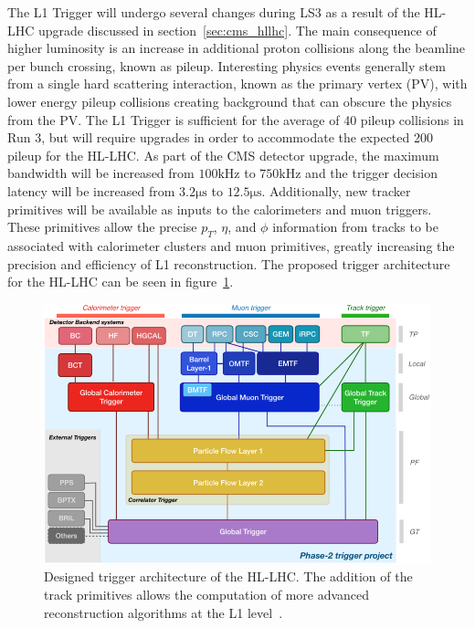 The L1 Trigger will undergo several changes during LS3 as a result of the HL-LHC upgrade discussed in section~\ref{sec:cms_hllhc}. The main consequence of higher luminosity is an increase in additional proton collisions along the beamline per bunch crossing, known as pileup. Interesting physics events generally stem from a single hard scattering interaction, known as the primary vertex (PV), with lower energy pileup collisions creating background that can obscure the physics from the PV. The L1 Trigger is sufficient for the average of 40 pileup collisions in Run 3, but will require upgrades in order to accommodate the expected 200 pileup for the HL-LHC. As part of the CMS detector upgrade, the maximum bandwidth will be increased from $100\unit{\kilo\hertz}$ to $750\unit{\kilo\hertz}$ and the trigger decision latency will be increased from $3.2\unit{\micro\second}$ to $12.5\unit{\micro\second}$. Additionally, new tracker primitives will be available as inputs to the calorimeters and muon triggers. These primitives allow the precise $p_T$, $\eta$, and $\phi$ information from tracks to be associated with calorimeter clusters and muon primitives, greatly increasing the precision and efficiency of L1 reconstruction. The proposed trigger architecture for the HL-LHC can be seen in figure~\ref{fig:HL_L1_trig}.

\begin{figure} [htbp]
	\centering
	\includegraphics[width=0.65\linewidth]{figs/03_experiment/HLLHC_L1T.png}
	\caption[Designed trigger architecture of the HL-LHC. The addition of the track primitives allows the computation of more advanced reconstruction algorithms at the L1 level.]{Designed trigger architecture of the HL-LHC. The addition of the track primitives allows the computation of more advanced reconstruction algorithms at the L1 level~\cite{inproceedings}.} 
	\label{fig:HL_L1_trig}
\end{figure}

